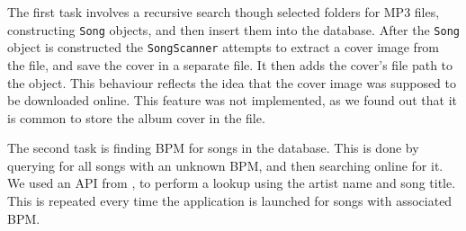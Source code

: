The first task involves a recursive search though selected folders for MP3 files, constructing \texttt{Song} objects, and then insert them into the database. After the \texttt{Song} object is constructed the \texttt{SongScanner} attempts to extract a cover image from the file, and save the cover in a separate file. It then adds the cover's file path to the object. This behaviour reflects the idea that the cover image was supposed to be downloaded online. This feature was not implemented, as we found out that it is common to store the album cover in the file.

The second task is finding BPM for songs in the database. This is done by querying for all songs with an unknown BPM, and then searching online for it. We used an API from \citet{echonest:API}, to perform a lookup using the artist name and song title. This is repeated every time the application is launched for songs with associated BPM.